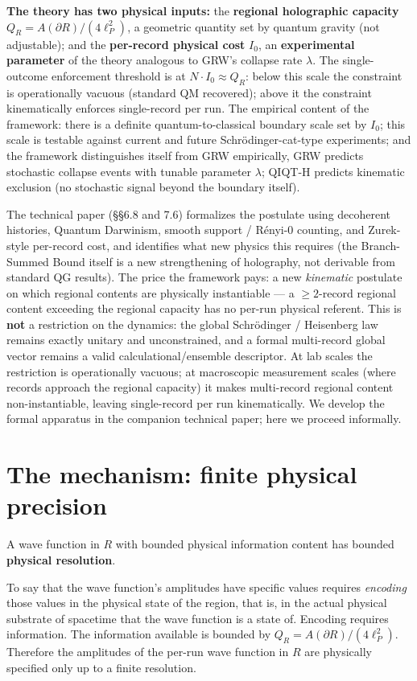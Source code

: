 \documentclass[11pt,a4paper]{article}
\begin{document}
\textbf{The theory has two physical inputs:} the \textbf{regional holographic capacity} $Q_R = A(\partial R)/(4\ell_P^2)$, a geometric quantity set by quantum gravity (not adjustable); and the \textbf{per-record physical cost} $I_0$, an \textbf{experimental parameter} of the theory analogous to GRW's collapse rate $\lambda$. The single-outcome enforcement threshold is at $N \cdot I_0 \approx Q_R$: below this scale the constraint is operationally vacuous (standard QM recovered); above it the constraint kinematically enforces single-record per run. The empirical content of the framework: there is a definite quantum-to-classical boundary scale set by $I_0$; this scale is testable against current and future Schrödinger-cat-type experiments; and the framework distinguishes itself from GRW empirically, GRW predicts stochastic collapse events with tunable parameter $\lambda$; QIQT-H predicts kinematic exclusion (no stochastic signal beyond the boundary itself).

The technical paper (§§6.8 and 7.6) formalizes the postulate using decoherent histories, Quantum Darwinism, smooth support / Rényi-0 counting, and Zurek-style per-record cost, and identifies what new physics this requires (the Branch-Summed Bound itself is a new strengthening of holography, not derivable from standard QG results). The price the framework pays: a new \emph{kinematic} postulate on which regional contents are physically instantiable — a $\ge 2$-record regional content exceeding the regional capacity has no per-run physical referent. This is \textbf{not} a restriction on the dynamics: the global Schrödinger / Heisenberg law remains exactly unitary and unconstrained, and a formal multi-record global vector remains a valid calculational/ensemble descriptor. At lab scales the restriction is operationally vacuous; at macroscopic measurement scales (where records approach the regional capacity) it makes multi-record regional content non-instantiable, leaving single-record per run kinematically. We develop the formal apparatus in the companion technical paper; here we proceed informally.

\section{The mechanism: finite physical precision}

A wave function in $R$ with bounded physical information content has bounded \textbf{physical resolution}.

To say that the wave function's amplitudes have specific values requires \emph{encoding} those values in the physical state of the region, that is, in the actual physical substrate of spacetime that the wave function is a state of. Encoding requires information. The information available is bounded by $Q_R = A(\partial R)/(4\ell_P^2)$. Therefore the amplitudes of the per-run wave function in $R$ are physically specified only up to a finite resolution.
\end{document}
